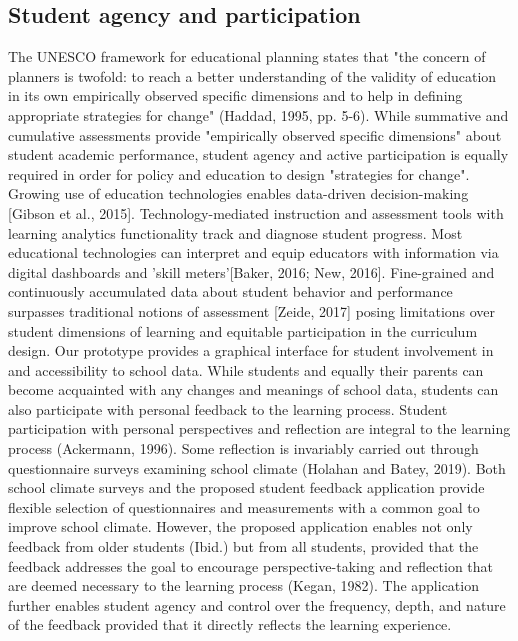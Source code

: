 \documentclass{article}
\begin{document}
\subsection{Student agency and participation}
The UNESCO framework for educational planning states that "the concern of planners is twofold: to reach a better understanding of the validity of education in its own empirically observed specific dimensions and to help in defining appropriate strategies for change" (Haddad, 1995, pp. 5-6).
\bigbreak
While summative and cumulative assessments provide "empirically observed specific dimensions" about student academic performance, student agency and active participation is equally required in order for policy and education to design "strategies for change". Growing use of education technologies enables data-driven decision-making [Gibson et al., 2015]. Technology-mediated instruction and assessment tools with learning analytics functionality track and diagnose student progress. Most educational technologies can interpret and equip educators with information via digital dashboards and 'skill meters'[Baker, 2016; New, 2016]. Fine-grained and continuously accumulated data about student behavior and performance surpasses traditional notions of assessment [Zeide, 2017] posing limitations over student dimensions of learning and equitable participation in the curriculum design.
\bigbreak
Our prototype provides a graphical interface for student involvement in and accessibility to school data. While students and equally their parents can become acquainted with any changes and meanings of school data, students can also participate with personal feedback to the learning process. Student participation with personal perspectives and reflection are integral to the learning process (Ackermann, 1996). Some reflection is invariably carried out through questionnaire surveys examining school climate (Holahan and Batey, 2019). Both school climate surveys and the proposed student feedback application provide flexible selection of questionnaires and measurements with a common goal to improve school climate. However, the proposed application enables not only feedback from older students (Ibid.) but from all students, provided that the feedback addresses the goal to encourage perspective-taking and reflection that are deemed necessary to the learning process (Kegan, 1982). The application further enables student agency and control over the frequency, depth, and nature of the feedback provided that it directly reflects the learning experience.
\end{document}
